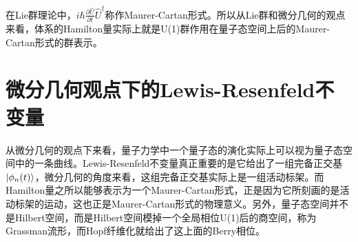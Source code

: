 \documentclass[a4paper]{article}
\begin{document}
        在Lie群理论中，$i\hbar\frac{\partial\hat{U}}{\partial t}\hat{U}^\dagger$称作Maurer-Cartan形式。所以从Lie群和微分几何的观点来看，体系的Hamilton量实际上就是U(1)群作用在量子态空间上后的Maurer-Cartan形式的群表示。



    \section{微分几何观点下的Lewis-Resenfeld不变量}

        从微分几何的观点下来看，量子力学中一个量子态的演化实际上可以视为量子态空间中的一条曲线。Lewis-Resenfeld不变量真正重要的是它给出了一组完备正交基$\ket{\phi_n(t)}$，微分几何的角度来看，这组完备正交基实际上是一组活动标架。而Hamilton量之所以能够表示为一个Maurer-Cartan形式，正是因为它所刻画的是活动标架的运动，这也正是Maurer-Cartan形式的物理意义。另外，量子态空间并不是Hilbert空间，而是Hilbert空间模掉一个全局相位U(1)后的商空间，称为Grassman流形，而Hopf纤维化就给出了这上面的Berry相位。
\end{document}
